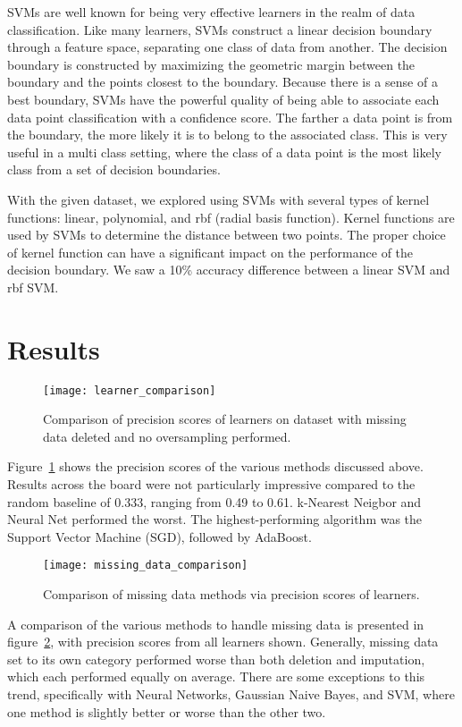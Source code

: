 \documentclass[conference]{IEEEtran}
\begin{document}
SVMs are well known for being very effective learners in the realm of data classification. Like many learners, SVMs construct a linear decision boundary through a feature space, separating one class of data from another. The decision boundary is constructed by maximizing the geometric margin between the boundary and the points closest to the boundary. Because there is a sense of a best boundary, SVMs have the powerful quality of being able to associate each data point classification with a confidence score. The farther a data point is from the boundary, the more likely it is to belong to the associated class. This is very useful in a multi class setting, where the class of a data point is the most likely class from a set of decision boundaries.

With the given dataset, we explored using SVMs with several types of kernel functions: linear, polynomial, and rbf (radial basis function). Kernel functions are used by SVMs to determine the distance between two points. The proper choice of kernel function can have a significant impact on the performance of the decision boundary. We saw a 10\% accuracy difference between a linear SVM and rbf SVM.

\section{Results}

\begin{figure}[htpb]
	\centering
	\texttt{[image: learner\_comparison]}
	\caption{Comparison of precision scores of learners on dataset with missing data deleted and no oversampling performed.}
	\label{fig:learner_comp}
\end{figure}

Figure~\ref{fig:learner_comp} shows the precision scores of the various methods discussed above. Results across the board were not particularly impressive compared to the random baseline of 0.333, ranging from 0.49 to 0.61. k-Nearest Neigbor and Neural Net performed the worst. The highest-performing algorithm was the Support Vector Machine (SGD), followed by AdaBoost.

\begin{figure}[htpb]
	\centering
	\texttt{[image: missing\_data\_comparison]}
	\caption{Comparison of missing data methods via precision scores of learners.}
	\label{fig:missing_data_comp}
\end{figure}

A comparison of the various methods to handle missing data is presented in figure~\ref{fig:missing_data_comp}, with precision scores from all learners shown. Generally, missing data set to its own category performed worse than both deletion and imputation, which each performed equally on average. There are some exceptions to this trend, specifically with Neural Networks, Gaussian Naive Bayes, and SVM, where one method is slightly better or worse than the other two.
\end{document}
